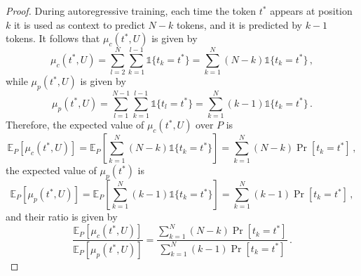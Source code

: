 \begin{proof}
During autoregressive training, each time the token $t^*$ appears at position $k$ it is used as context to predict $N-k$ tokens, and it is predicted by $k-1$ tokens.
%
It follows that $\mu_c(t^*, U)$ is given by 
%
\begin{equation}
\mu_c(t^*, U) = \sum_{l=2}^N\sum_{k=1}^{l-1} \mathds{1}\{t_k = t^*\} = \sum_{k=1}^N (N-k)\mathds{1}\{t_k = t^*\}\,,
\end{equation}
%
while $\mu_p(t^*, U)$ is given by 
%
\begin{equation}
\mu_p(t^*, U) = \sum_{l=1}^{N-1}\sum_{k=1}^{l-1} \mathds{1}\{t_l = t^*\} = \sum_{k=1}^N (k-1)\mathds{1}\{t_k = t^*\}\,.
\end{equation}
%
Therefore, the expected value of $\mu_c(t^*, U)$ over $P$ is
%
\begin{equation}
\mathbb{E}_P[\mu_c(t^*, U)] = \mathbb{E}_P\left[\sum_{k=1}^N (N-k)\mathds{1}\{t_k = t^*\}\right] =   \sum_{k=1}^N(N-k)\Pr[t_k = t^*]\,,
\end{equation}
%
the expected value of $\mu_p(t^*)$ is
%
\begin{equation}
\mathbb{E}_P[\mu_p(t^*, U)] = \mathbb{E}_P\left[\sum_{k=1}^N (k-1)\mathds{1}\{t_k = t^*\}\right] =   \sum_{k=1}^N(k-1)\Pr[t_k = t^*]\,,
\end{equation}
%
and their ratio is given by
%
\begin{equation}
\label{suppeq:ratio-autoregressive}
    \frac{\mathbb{E}_P[\mu_c(t^*, U)]}{\mathbb{E}_P[\mu_p(t^*, U)]} = \frac{\sum_{k=1}^N (N-k)\Pr[t_k = t^*]}{\sum_{k=1}^N(k-1)\Pr[t_k = t^*]} \,.
\end{equation}
%


\end{proof}
